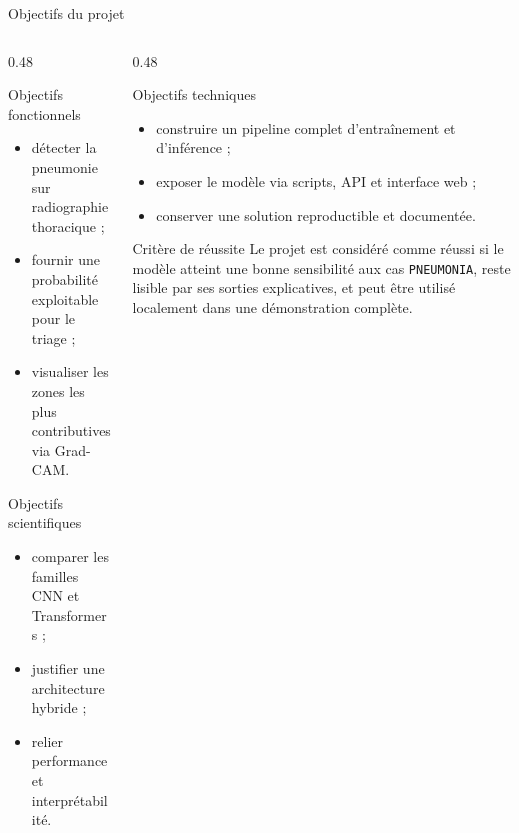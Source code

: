 \begin{frame}{Objectifs du projet}
\small
\begin{columns}[T,onlytextwidth]
\begin{column}{0.48\textwidth}
\begin{block}{Objectifs fonctionnels}
\begin{itemize}
\item détecter la pneumonie sur radiographie thoracique ;
\item fournir une probabilité exploitable pour le triage ;
\item visualiser les zones les plus contributives via Grad-CAM.
\end{itemize}
\end{block}
\begin{block}{Objectifs scientifiques}
\begin{itemize}
\item comparer les familles CNN et Transformers ;
\item justifier une architecture hybride ;
\item relier performance et interprétabilité.
\end{itemize}
\end{block}
\end{column}
\begin{column}{0.48\textwidth}
\begin{block}{Objectifs techniques}
\begin{itemize}
\item construire un pipeline complet d'entraînement et d'inférence ;
\item exposer le modèle via scripts, API et interface web ;
\item conserver une solution reproductible et documentée.
\end{itemize}
\end{block}
\begin{alertblock}{Critère de réussite}
Le projet est considéré comme réussi si le modèle atteint une bonne sensibilité aux cas \texttt{PNEUMONIA}, reste lisible par ses sorties explicatives, et peut être utilisé localement dans une démonstration complète.
\end{alertblock}
\end{column}
\end{columns}
\end{frame}

